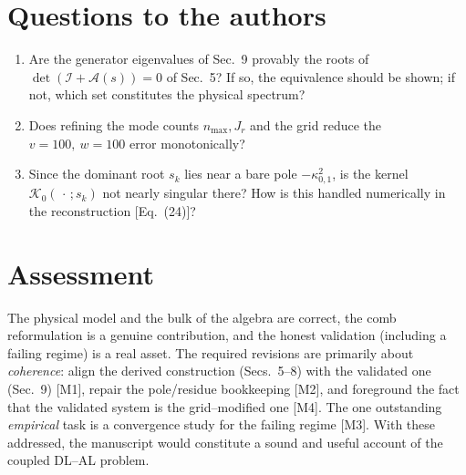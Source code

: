 \documentclass{article}
\begin{document}
\section{Questions to the authors}
\begin{enumerate}[leftmargin=1.6em]
\item Are the generator eigenvalues of Sec.~9 provably the roots of
$\det(\mathcal I+\mathcal A(s))=0$ of Sec.~5? If so, the equivalence should be
shown; if not, which set constitutes the physical spectrum?
\item Does refining the mode counts $n_{\max},J_r$ and the grid reduce the
$v=100,\ w=100$ error monotonically?
\item Since the dominant root $s_k$ lies near a bare pole $-\kappa_{0,1}^2$, is the
kernel $\mathcal K_0(\,\cdot\,;s_k)$ not nearly singular there? How is this handled
numerically in the reconstruction [Eq.~(24)]?
\end{enumerate}

\section{Assessment}
The physical model and the bulk of the algebra are correct, the comb
reformulation is a genuine contribution, and the honest validation (including a
failing regime) is a real asset. The required revisions are primarily about
\emph{coherence}: align the derived construction (Secs.~5--8) with the validated
one (Sec.~9) [M1], repair the pole/residue bookkeeping [M2], and foreground the
fact that the validated system is the grid--modified one [M4]. The one outstanding
\emph{empirical} task is a convergence study for the failing regime [M3]. With
these addressed, the manuscript would constitute a sound and useful account of the
coupled DL--AL problem.
\end{document}
